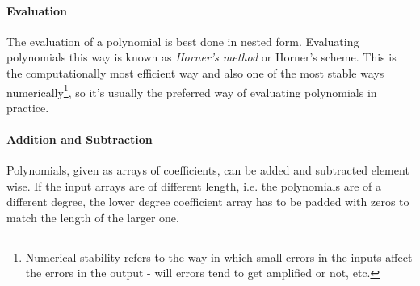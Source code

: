


\paragraph{Evaluation}
The evaluation of a polynomial is best done in nested form. Evaluating polynomials this way is known as \emph{Horner's method} or Horner's scheme. This is the computationally most efficient way and also one of the most stable ways numerically\footnote{Numerical stability refers to the way in which small errors in the inputs affect the errors in the output - will errors tend to get amplified or not, etc.}, so it's usually the preferred way of evaluating polynomials in practice.





\paragraph{Addition and Subtraction}
Polynomials, given as arrays of coefficients, can be added and subtracted element wise. If the input arrays are of different length, i.e. the polynomials are of a different degree, the lower degree coefficient array has to be padded with zeros to match the length of the larger one.

